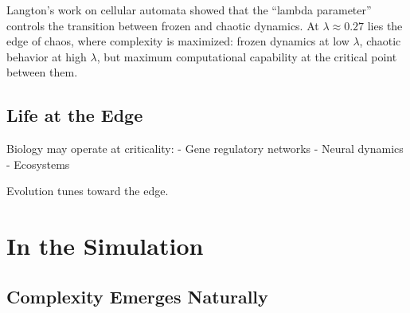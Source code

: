 \documentclass[
  11pt,
  letterpaper,
  twoside,
  openright]{book}
\begin{document}
Langton's work on cellular automata showed that the ``lambda parameter''
controls the transition between frozen and chaotic dynamics. At
\(\lambda \approx 0.27\) lies the edge of chaos, where complexity is
maximized: frozen dynamics at low \(\lambda\), chaotic behavior at high
\(\lambda\), but maximum computational capability at the critical point
between them.

\subsection{Life at the Edge}\label{life-at-the-edge}

Biology may operate at criticality: - Gene regulatory networks - Neural
dynamics - Ecosystems

Evolution tunes toward the edge.

\section{In the Simulation}\label{in-the-simulation-1}

\subsection{Complexity Emerges
Naturally}\label{complexity-emerges-naturally}
\end{document}
